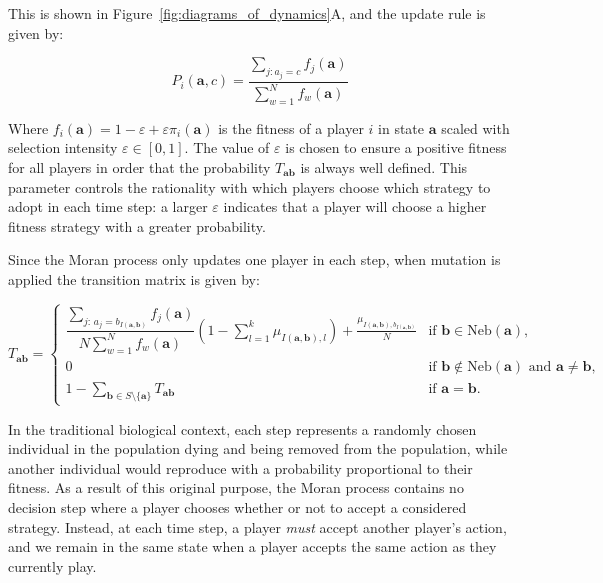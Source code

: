 \documentclass{article}
\begin{document}
This is shown in Figure~\ref{fig:diagrams_of_dynamics}A, and the update rule is
given by:

\begin{equation}
    P_i(\mathbf{a}, c) = \dfrac{\sum_{j: a_j = c} f_j(\mathbf{a})}{\sum_{w=1}^N f_w(\mathbf{a})}
    \label{eqn:moran_update}
\end{equation}

Where \(f_i(\mathbf{a}) = 1 - \varepsilon + \varepsilon\pi_i(\mathbf{a})\) is
the fitness of a player \(i\) in state \(\mathbf{a}\) scaled with selection
intensity \(\varepsilon\in [0,1]\). The value of \(\varepsilon\) is chosen to ensure a
positive fitness for all players in order that the probability
\(T_{\mathbf{ab}}\) is always well defined. This parameter controls the
rationality with which players choose which strategy to adopt in each time step:
a larger \(\varepsilon\) indicates that a player will choose a higher fitness
strategy with a greater probability.

Since the Moran process only updates one player in each step, when mutation is
applied the transition matrix is given by:

\begin{equation}
    T_{\mathbf{ab}} =
    \begin{cases}
        \dfrac{\sum_{j:\, a_j = b_{I(\mathbf{a}, \mathbf{b})}} f_j(\mathbf{a})}{N\sum_{w=1}^N f_w(\mathbf{a})}\left(1 - \sum_{l=1}^k \mu_{I(\mathbf{a}, \mathbf{b}), l}\right)+ \frac{\mu_{I(\mathbf{a}, \mathbf{b}), b_{I(\mathbf{a}, \mathbf{b})}}}{N} & \text{if } \mathbf{b} \in \mathrm{Neb}(\mathbf{a}),\\
        0 & \text{if } \mathbf{b} \notin \mathrm{Neb}(\mathbf{a}) \text{ and } \mathbf{a} \neq \mathbf{b},\\
        1 - \sum_{\mathbf{b} \in S \setminus \{\mathbf{a}\}} T_{\mathbf{ab}} & \text{if } \mathbf{a} = \mathbf{b}.
    \end{cases}
\label{eqn:Moran_Probability_Function}
\end{equation}

In the traditional biological context, each step represents a randomly chosen
individual in the population dying and being removed from the population, while
another individual would reproduce with a probability proportional to their
fitness. As a result of this original purpose, the Moran process contains no
decision step where a player chooses whether or not to accept a considered
strategy. Instead, at each time step, a player \emph{must} accept another
player's action, and we remain in the same state when a player accepts the same
action as they currently play.
\end{document}
